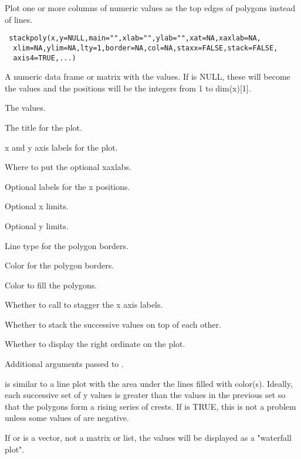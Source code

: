 \begin{Description}\relax
Plot one or more columns of numeric values as the top edges of polygons
instead of lines.
\end{Description}
\begin{Usage}
\begin{verbatim}
 stackpoly(x,y=NULL,main="",xlab="",ylab="",xat=NA,xaxlab=NA,
  xlim=NA,ylim=NA,lty=1,border=NA,col=NA,staxx=FALSE,stack=FALSE,
  axis4=TRUE,...)
\end{verbatim}
\end{Usage}
\begin{Arguments}
\begin{ldescription}
\item[\code{x}] A numeric data frame or matrix with the  values. If
 is NULL, these will become the  values and the 
positions will be the integers from 1 to dim(x)[1].
\item[\code{y}] The  values.
\item[\code{main}] The title for the plot.
\item[\code{xlab,ylab}] x and y axis labels for the plot.
\item[\code{xat}] Where to put the optional xaxlabs.
\item[\code{xaxlab}] Optional labels for the x positions.
\item[\code{xlim}] Optional x limits.
\item[\code{ylim}] Optional y limits.
\item[\code{lty}] Line type for the polygon borders.
\item[\code{border}] Color for the polygon borders.
\item[\code{col}] Color to fill the polygons.
\item[\code{staxx}] Whether to call  to stagger the x axis labels.
\item[\code{stack}] Whether to stack the successive values on top of each other.
\item[\code{axis4}] Whether to display the right ordinate on the plot.
\item[\code{...}] Additional arguments passed to .
\end{ldescription}
\end{Arguments}
\begin{Details}\relax
{} is similar to a line plot with the area under the
lines filled with color(s). Ideally, each successive set of y values
is greater than the values in the previous set so that the polygons 
form a rising series of crests. If  is TRUE, this is not a
problem unless some values of  are negative.

If  or  is a vector, not a matrix or list, the values will
be displayed as a "waterfall plot".
\end{Details}

